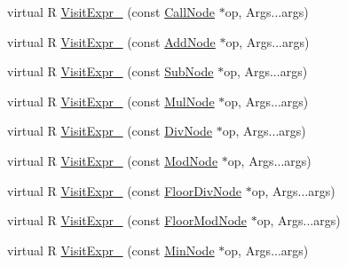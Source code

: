 \begin{DoxyCompactItemize}
\item 
virtual R \hyperlink{classtvm_1_1tir_1_1ExprFunctor_3_01R_07const_01PrimExpr_01_6n_00_01Args_8_8_8_08_4_a13857fc6f437b9de1568a2350aa793ca}{Visit\+Expr\+\_\+} (const \hyperlink{classtvm_1_1tir_1_1CallNode}{Call\+Node} $\ast$op, Args...\+args)
\item 
virtual R \hyperlink{classtvm_1_1tir_1_1ExprFunctor_3_01R_07const_01PrimExpr_01_6n_00_01Args_8_8_8_08_4_af7907e3fad79cd66e1de242cd4a93a6d}{Visit\+Expr\+\_\+} (const \hyperlink{classtvm_1_1tir_1_1AddNode}{Add\+Node} $\ast$op, Args...\+args)
\item 
virtual R \hyperlink{classtvm_1_1tir_1_1ExprFunctor_3_01R_07const_01PrimExpr_01_6n_00_01Args_8_8_8_08_4_a233096cf5a0c8406fc388f02cefdec87}{Visit\+Expr\+\_\+} (const \hyperlink{classtvm_1_1tir_1_1SubNode}{Sub\+Node} $\ast$op, Args...\+args)
\item 
virtual R \hyperlink{classtvm_1_1tir_1_1ExprFunctor_3_01R_07const_01PrimExpr_01_6n_00_01Args_8_8_8_08_4_a560ee745377087a4541bde1fc8411da9}{Visit\+Expr\+\_\+} (const \hyperlink{classtvm_1_1tir_1_1MulNode}{Mul\+Node} $\ast$op, Args...\+args)
\item 
virtual R \hyperlink{classtvm_1_1tir_1_1ExprFunctor_3_01R_07const_01PrimExpr_01_6n_00_01Args_8_8_8_08_4_a77990d92efd6962b27e8b5cf8c5611c7}{Visit\+Expr\+\_\+} (const \hyperlink{classtvm_1_1tir_1_1DivNode}{Div\+Node} $\ast$op, Args...\+args)
\item 
virtual R \hyperlink{classtvm_1_1tir_1_1ExprFunctor_3_01R_07const_01PrimExpr_01_6n_00_01Args_8_8_8_08_4_a97bcf0ff5e20fb4374b76184a8698684}{Visit\+Expr\+\_\+} (const \hyperlink{classtvm_1_1tir_1_1ModNode}{Mod\+Node} $\ast$op, Args...\+args)
\item 
virtual R \hyperlink{classtvm_1_1tir_1_1ExprFunctor_3_01R_07const_01PrimExpr_01_6n_00_01Args_8_8_8_08_4_a7702819f9b60f981fca12d86c39bce6e}{Visit\+Expr\+\_\+} (const \hyperlink{classtvm_1_1tir_1_1FloorDivNode}{Floor\+Div\+Node} $\ast$op, Args...\+args)
\item 
virtual R \hyperlink{classtvm_1_1tir_1_1ExprFunctor_3_01R_07const_01PrimExpr_01_6n_00_01Args_8_8_8_08_4_a15457cbdb3e931d04079d5a97f8efb8d}{Visit\+Expr\+\_\+} (const \hyperlink{classtvm_1_1tir_1_1FloorModNode}{Floor\+Mod\+Node} $\ast$op, Args...\+args)
\item 
virtual R \hyperlink{classtvm_1_1tir_1_1ExprFunctor_3_01R_07const_01PrimExpr_01_6n_00_01Args_8_8_8_08_4_a61deef988487dff4afe32841d5460c73}{Visit\+Expr\+\_\+} (const \hyperlink{classtvm_1_1tir_1_1MinNode}{Min\+Node} $\ast$op, Args...\+args)

\end{DoxyCompactItemize}
